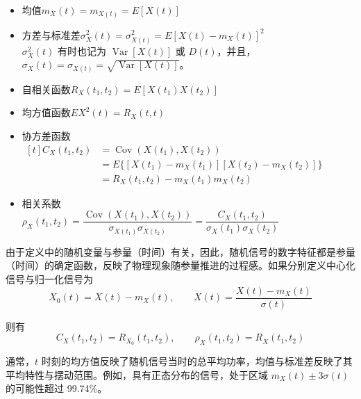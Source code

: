 \documentclass[11pt,openany,UTF8]{ctexbook}
\newcommand{\E}{E}                                 %
\DeclareMathOperator{\Var}{Var}                    %
\DeclareMathOperator{\Cov}{Cov}                    %
\begin{document}
\begin{itemize}
  \setlength{\itemsep}{1pt}
  \item 均值\hfill $m_X(t)=m_{X(t)}=\E[X(t)]$
  \item 方差与标准差\hfill $\sigma_X^2(t)=\sigma_{X(t)}^2=\E[X(t)-m_X(t)]^2$\\
        $\sigma_X^2(t)$ 有时也记为 $\Var[X(t)]$ 或 $D(t)$\nobreak，并且\nobreak，$\sigma_X(t)=\sigma_{X(t)}=\sqrt{\Var[X(t)]}$\nobreak。
  \item 自相关函数\hfill $R_X(t_1,t_2)=\E[X(t_1)X(t_2)]$
  \item 均方值函数\hfill $\E X^2(t)=R_X(t,t)$
  \item 协方差函数\hfill $\begin{aligned}[t]
        C_X(t_1,t_2)&=\Cov(X(t_1),X(t_2))\\
        &=\E\{[X(t_1)-m_X(t_1)][X(t_2)-m_X(t_2)]\}\\
        &=R_X(t_1,t_2)-m_X(t_1)m_X(t_2)
        \end{aligned}$
  \item 相关系数\\[1pt]
        \hfill $\rho_X(t_1,t_2)=\dfrac{\Cov(X(t_1),X(t_2))}{\sigma_{X(t_1)}\sigma_{X(t_2)}}=\dfrac{C_X(t_1,t_2)}{\sigma_X(t_1)\sigma_X(t_2)}$
\end{itemize}

由于定义中的随机变量与参量（时间\nobreak）有关\nobreak，因此\nobreak，随机信号的数字特征都是参量（时间\nobreak）的确定函数\nobreak，反映了物理现象随参量推进的过程感\nobreak。如果分别定义中心化信号与归一化信号为
\begin{equation}
  X_0(t)=X(t)-m_X(t),\qquad \dot{X}(t)=\frac{X(t)-m_X(t)}{\sigma(t)}
  \label{eq:2.1}
\end{equation}

则有
\begin{equation}
  C_X(t_1,t_2)=R_{X_0}(t_1,t_2),\qquad \rho_X(t_1,t_2)=R_{\dot{X}}(t_1,t_2)
  \label{eq:2.2}
\end{equation}

通常\nobreak，$t$ 时刻的均方值反映了随机信号当时的总平均功率\nobreak，均值与标准差反映了其平均特性与摆动范围\nobreak。例如\nobreak，具有正态分布的信号\nobreak，处于区域 $m_X(t)\pm3\sigma(t)$ 的可能性超过 99.74\%\nobreak。%
\end{document}
